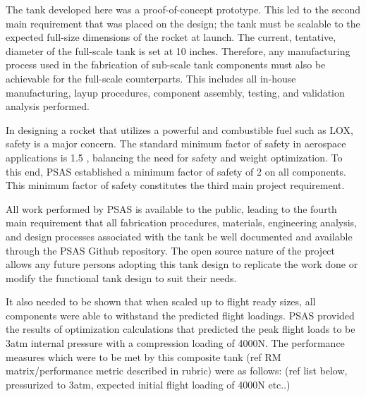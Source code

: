 The tank developed here was a proof-of-concept prototype. This led to the second main requirement that was placed on the design; the tank must be scalable to the expected full-size dimensions of the rocket at launch. The current, tentative, diameter of the full-scale tank is set at 10 inches. Therefore, any manufacturing process used in the fabrication of sub-scale tank components must also be achievable for the full-scale counterparts. This includes all in-house manufacturing, layup procedures, component assembly, testing, and validation analysis performed.

In designing a rocket that utilizes a powerful and combustible fuel such as LOX, safety is a major concern. The standard minimum factor of safety in aerospace applications is 1.5 \cite{FS15}, balancing the need for safety and weight optimization. To this end, PSAS established a minimum factor of safety of 2 on all components. This minimum factor of safety constitutes the third main project requirement.


All work performed by PSAS is available to the public, leading to the fourth main requirement that all fabrication procedures, materials, engineering analysis, and design processes associated with the tank be well documented and available through the PSAS Github repository. The open source nature of the project allows any future persons adopting this tank design to replicate the work done or modify the functional tank design to suit their needs.

It also needed to be shown that when scaled up to flight ready sizes, all components were able to withstand the predicted flight loadings. PSAS provided the results of optimization calculations that predicted the peak flight loads to be 3atm internal pressure with a compression loading of 4000N. The performance measures which were to be met by this composite tank (ref RM matrix/performance metric described in rubric) were as follows:  (ref list below, pressurized to 3atm, expected initial flight loading of 4000N etc..)

